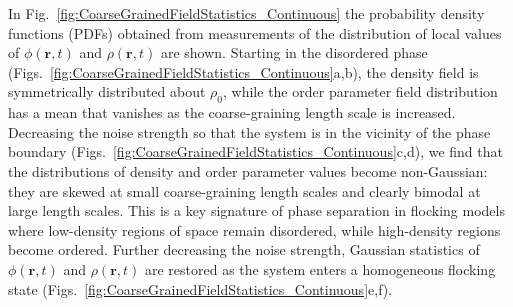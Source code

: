 \documentclass[twoside,twocolumn,9pt]{article}
\begin{document}
In Fig.~\ref{fig:CoarseGrainedFieldStatistics_Continuous} the probability density functions (PDFs) obtained from measurements of the distribution of local values of $\phi(\mathbf{r},t)$ and $\rho(\mathbf{r},t)$ are shown. 
Starting in the disordered phase (Figs.~\ref{fig:CoarseGrainedFieldStatistics_Continuous}a,b), the density field is symmetrically distributed about $\rho_{0}$, while the order parameter field distribution has a mean that vanishes as the coarse-graining length scale is increased.
Decreasing the noise strength so that the system is in the vicinity of the phase boundary (Figs.~\ref{fig:CoarseGrainedFieldStatistics_Continuous}c,d), we find that the distributions of density and order parameter values become non-Gaussian: they are skewed at small coarse-graining length scales and clearly bimodal at large length scales.
This is a key signature of phase separation in flocking models where low-density regions of space remain disordered, while high-density regions become ordered. 
Further decreasing the noise strength, Gaussian statistics of $\phi(\mathbf{r},t)$ and $\rho(\mathbf{r},t)$ are restored as the system enters a homogeneous flocking state (Figs.~\ref{fig:CoarseGrainedFieldStatistics_Continuous}e,f).
\end{document}
